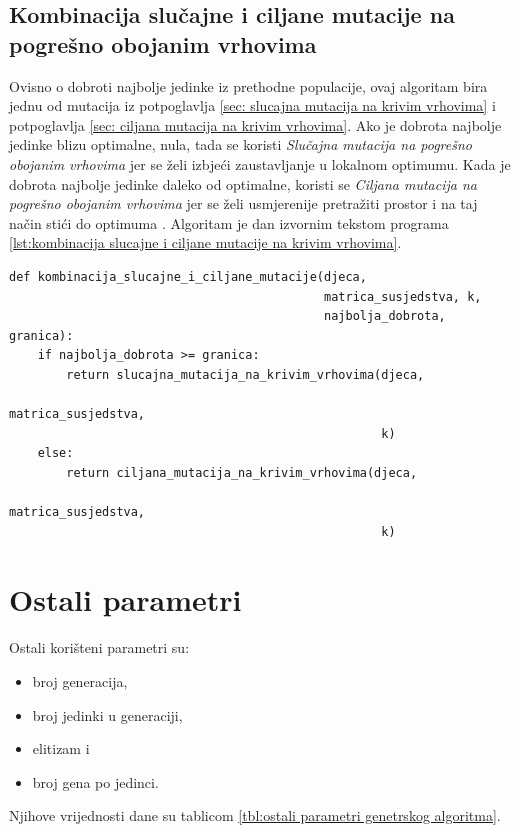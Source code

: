 \documentclass[times, utf8, zavrsni, numeric]{fer}
\begin{document}
\subsection{Kombinacija slučajne i ciljane mutacije na pogrešno obojanim vrhovima}
\label{sec: kombinacija slucajne i ciljane mutacije na krivim vrhovima}
Ovisno o dobroti najbolje jedinke iz prethodne populacije, ovaj algoritam bira jednu od mutacija iz potpoglavlja \ref{sec: slucajna mutacija na krivim vrhovima} i potpoglavlja \ref{sec: ciljana mutacija na krivim vrhovima}. Ako je dobrota najbolje jedinke blizu optimalne, nula, tada se koristi \textit{Slučajna mutacija na pogrešno obojanim vrhovima} jer se želi izbjeći zaustavljanje u lokalnom optimumu. Kada je dobrota najbolje jedinke daleko od optimalne, koristi se \textit{Ciljana mutacija na pogrešno obojanim vrhovima} jer se želi usmjerenije pretražiti prostor i na taj način stići do optimuma \cite{hindi2012genetic}. Algoritam je dan izvornim tekstom programa \ref{lst:kombinacija slucajne i ciljane mutacije na krivim vrhovima}.

\begin{lstlisting}[caption=Kombinacija slučajne i ciljane mutacije na pogrešno obojanim vrhovima, label={lst:kombinacija slucajne i ciljane mutacije na krivim vrhovima}]
def kombinacija_slucajne_i_ciljane_mutacije(djeca, 
                                            matrica_susjedstva, k, 
                                            najbolja_dobrota, granica):
    if najbolja_dobrota >= granica:
        return slucajna_mutacija_na_krivim_vrhovima(djeca, 
                                                    matrica_susjedstva, 
                                                    k)
    else:
        return ciljana_mutacija_na_krivim_vrhovima(djeca,
                                                    matrica_susjedstva, 
                                                    k)
\end{lstlisting}

\section{Ostali parametri}
Ostali korišteni parametri su:
\begin{itemize}
    \item broj generacija,
    \item broj jedinki u generaciji,
    \item elitizam i
    \item broj gena po jedinci.
\end{itemize}
Njihove vrijednosti dane su tablicom \ref{tbl:ostali parametri genetrskog algoritma}.
\end{document}

